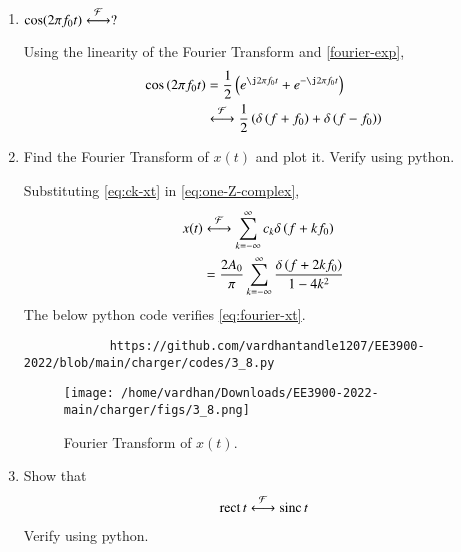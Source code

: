 \documentclass[journal,12pt,twocolumn]{IEEEtran}
\renewcommand\thesection{\arabic{section}}
\begin{document}
\begin{enumerate}[label=\thesection.\arabic*
		,ref=\thesection.\theenumi]
		\solution Suppose $g(t)\system{F}G(f)$. Then,
		\begin{align}
			g(t)e^{\j2\pi f_0t}&\system{F}\int_{-\infty}^{\infty}
			g(t)e^{-\j2\pi\brak{f-f_0}t}\, dt \\
			&=F(f-f_0)
			\label{eq:f-shift}
		\end{align}
		Using \eqref{eq:duality} in \eqref{eq:fourier-delta}, $1\system{F}\delta(-f)$.
		Hence, applying \eqref{eq:f-shift},
		\begin{align}
			e^{-\j2\pi f_0t}\system{F}\delta(-(f+f_0)) = \delta(f+f_0)
			\label{eq:fourier-exp}
		\end{align}
		\item $\cos(2\pi f_0t)\overset{\mathcal{F}}{ \longleftrightarrow}?$
		
		\solution Using the linearity of the Fourier 
		Transform and \eqref{fourier-exp},
		\begin{align}
			\cos\brak{2\pi f_0t} &= \frac{1}{2}
			\brak{e^{\j2\pi f_0t} + e^{-\j2\pi f_0t}} \\
			&\system{F}\frac{1}{2}\brak{\delta\brak{f+f_0} + \delta\brak{f-f_0}}
		\end{align}
		\item Find the Fourier Transform of $x(t)$ and plot it. Verify using python.
		
		\solution Substituting \eqref{eq:ck-xt} in \eqref{eq:one-Z-complex},
		\begin{align}
			x(t)&\overset{\mathcal{F}}{ \longleftrightarrow}\sum_{k=-\infty}^{\infty}c_k\delta\left(f+kf_0\right) \\
			&=\frac{2A_0}{\pi}\sum_{k=-\infty}^{\infty}\frac{\delta\left(f+2kf_0\right)}{1-4k^2}
			\label{eq:fourier-xt}
		\end{align}
		The below python code verifies \eqref{eq:fourier-xt}.
		\begin{lstlisting}
			https://github.com/vardhantandle1207/EE3900-2022/blob/main/charger/codes/3_8.py
		\end{lstlisting}
		\begin{figure}[!ht]
			\texttt{[image: /home/vardhan/Downloads/EE3900-2022-main/charger/figs/3\_8.png]}
			\caption{Fourier Transform of $x(t)$.}
			\label{eq:fig-fourier-xt}
		\end{figure}
		\item Show that
		\begin{align}
			\mathop{\mathrm{rect}}{t} \overset{\mathcal{F}}{ \longleftrightarrow} \mathop{\mathrm{sinc}}{t}
		\end{align}
		Verify using python.
		

\end{enumerate}
\end{document}
